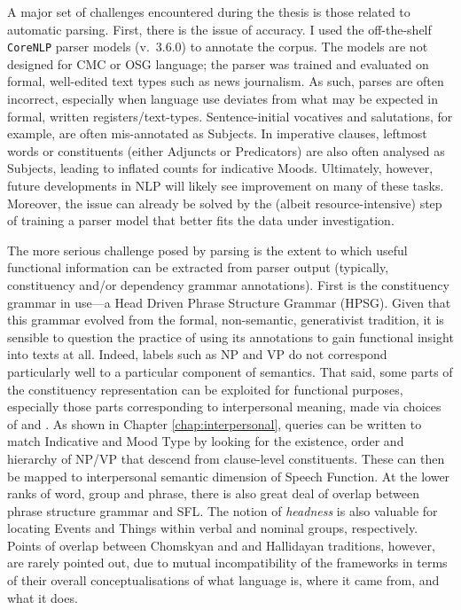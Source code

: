 A major set of challenges encountered during the thesis is those related to automatic parsing. First, there is the issue of accuracy. I used the off\hyp{}the\hyp{}shelf \texttt{CoreNLP} parser models (v.~3.6.0) to annotate the corpus. The models are not designed for \gls{CMC} or \gls{OSG} language; the parser was trained and evaluated on formal, well\hyp{}edited text types such as news journalism. As such, parses are often incorrect, especially when language use deviates from what may be expected in formal, written registers\slash text\hyp{}types. Sentence\hyp{}initial vocatives and salutations, for example, are often mis\hyp{}annotated as Subjects. In imperative clauses, leftmost words or constituents (either Adjuncts or Predicators) are also often analysed as Subjects, leading to inflated counts for indicative Moods. Ultimately, however, future developments in \gls{NLP} will likely see improvement on many of these tasks. Moreover, the issue can already be solved by the (albeit resource-intensive) step of training a parser model that better fits the data under investigation.

The more serious challenge posed by parsing is the extent to which useful functional information can be extracted from parser output (typically, constituency and\slash or dependency grammar annotations). First is the constituency grammar in use---a Head Driven Phrase Structure Grammar (HPSG). Given that this grammar evolved from the formal, non\hyp{}semantic, generativist tradition, it is sensible to question the practice of using its annotations to gain functional insight into texts at all. Indeed, labels such as NP and VP do not correspond particularly well to a particular component of semantics. That said, some parts of the constituency representation can be exploited for functional purposes, especially those parts corresponding to interpersonal meaning, made via choices of  and . As shown in Chapter \ref{chap:interpersonal}, queries can be written to match Indicative and Mood Type by looking for the existence, order and hierarchy of NP\slash VP that descend from clause\hyp{}level constituents. These can then be mapped to interpersonal semantic dimension of Speech Function.  At the lower ranks of word, group and phrase, there is also great deal of overlap between phrase structure grammar and \gls{SFL}. The notion of \emph{headness} is also valuable for locating Events and Things within verbal and nominal groups, respectively. Points of overlap between Chomskyan and and Hallidayan traditions, however, are rarely pointed out, due to mutual incompatibility of the frameworks in terms of their overall conceptualisations of what language is, where it came from, and what it does.

